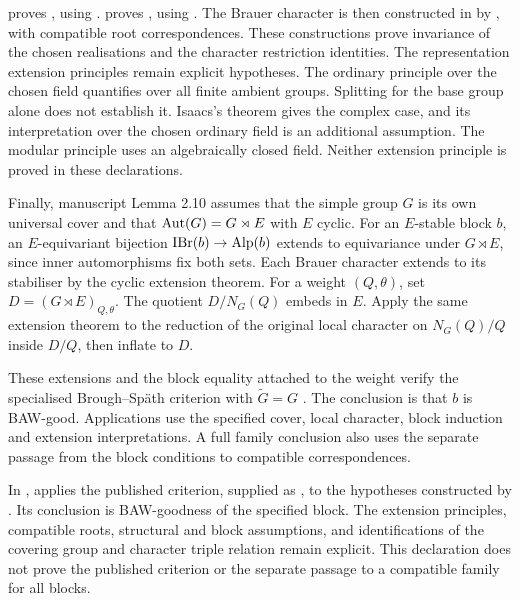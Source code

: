\begin{implementation}
 proves
, using
.
 proves
,
using .
The Brauer character is then constructed in
 by
,
with compatible root correspondences.
These constructions prove invariance of the chosen realisations and the
character restriction identities. The representation extension principles
remain explicit hypotheses. The ordinary principle over the chosen field
quantifies over all finite ambient groups. Splitting for the base group alone
does not establish it. Isaacs's theorem gives the complex case, and its
interpretation over the chosen ordinary field is an additional assumption.
The modular principle uses an algebraically closed field. Neither extension
principle is proved in these declarations.
\end{implementation}

Finally, manuscript Lemma 2.10 assumes that the simple group $G$
is its own universal cover and that $\operatorname{Aut}(G)=G\rtimes E$
with $E$ cyclic. For an $E$-stable block $b$, an $E$-equivariant
bijection $\operatorname{IBr}(b)\to\operatorname{Alp}(b)$ extends to equivariance under
$G\rtimes E$, since inner automorphisms fix both sets. Each
Brauer character extends to its stabiliser by the cyclic
extension theorem. For a weight $(Q,\theta)$, set
$D=(G\rtimes E)_{Q,\theta}$. The quotient
$D/N_G(Q)$ embeds in $E$. Apply the same extension theorem to
the reduction of the original local character on $N_G(Q)/Q$
inside $D/Q$, then inflate to $D$.

These extensions and the block equality attached to the weight
verify the specialised Brough--Sp\"ath criterion with
$\widetilde G=G$ \cite[Theorem~3.18]{FengLiZhang2022Jordan}.
The conclusion is that $b$ is BAW-good. Applications use the
specified cover, local character, block induction and extension
interpretations. A full family conclusion also uses the separate
passage from the block conditions to compatible correspondences.

\begin{implementation}
In ,
 applies the published criterion, supplied
as , to the hypotheses constructed by
.
Its conclusion is BAW-goodness of the specified block.
The extension principles, compatible roots, structural and block
assumptions, and identifications of the covering group and character
triple relation remain explicit. This declaration does not prove the
published criterion or the separate passage to a compatible family
for all blocks.
\end{implementation}

